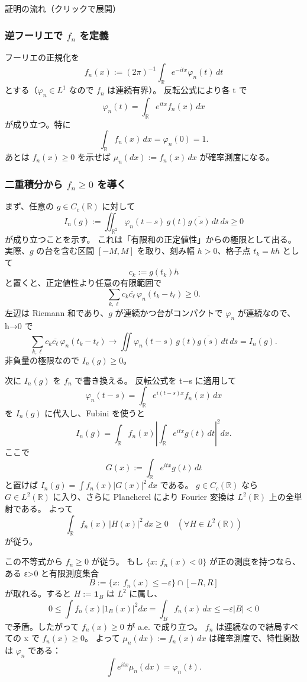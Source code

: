 \documentclass[uplatex,dvipdfmx,11pt,a4paper,openany]{bxjsbook}
\begin{document}
\begin{detailblock}{証明の流れ（クリックで展開）}
\subsubsection{逆フーリエで $f_n$ を定義}
フーリエの正規化を
            \[f_n(x):=(2\pi)^{-1}\int_{\mathbb R} e^{-itx}\varphi_n(t)\,dt\]
            とする（$\varphi_n\in L^1$ なので $f_n$ は連続有界）。
            反転公式により各 t で
            \[\varphi_n(t)=\int_{\mathbb R} e^{itx}f_n(x)\,dx\]
            が成り立つ。特に
            \[\int_{\mathbb R} f_n(x)\,dx=\varphi_n(0)=1.\]
            あとは $f_n(x)\ge 0$ を示せば $\mu_n(dx):=f_n(x)\,dx$ が確率測度になる。

\subsubsection{二重積分から $f_n\ge 0$ を導く}
まず、任意の $g\in C_c(\mathbb R)$ に対して
            \[I_n(g):=\iint_{\mathbb R^2}\varphi_n(t-s)\,g(t)\overline{g(s)}\,dt\,ds \ge 0\]
            が成り立つことを示す。
            これは「有限和の正定値性」からの極限として出る。
            実際、$g$ の台を含む区間 $[-M,M]$ を取り、刻み幅 $h>0$、格子点 $t_k=kh$ として
            \[c_k:=g(t_k)h\]
            と置くと、正定値性より任意の有限範囲で
            \[\sum_{k,\ell} c_k\overline{c_\ell}\,\varphi_n(t_k-t_\ell)\ge 0.\]
            左辺は Riemann 和であり、$g$ が連続かつ台がコンパクトで $\varphi_n$ が連続なので、
            h→0 で
            \[\sum_{k,\ell} c_k\overline{c_\ell}\,\varphi_n(t_k-t_\ell)\to
              \iint \varphi_n(t-s)\,g(t)\overline{g(s)}\,dt\,ds=I_n(g).\]
            非負量の極限なので $I_n(g)\ge 0$。

次に $I_n(g)$ を $f_n$ で書き換える。
            反転公式を t−s に適用して
            \[\varphi_n(t-s)=\int_{\mathbb R} e^{i(t-s)x}f_n(x)\,dx\]
            を $I_n(g)$ に代入し、Fubini を使うと
            \[I_n(g)
              =
              \int_{\mathbb R} f_n(x)\left|\int_{\mathbb R} e^{itx}g(t)\,dt\right|^2 dx.\]
            ここで
            \[G(x):=\int_{\mathbb R} e^{itx}g(t)\,dt\]
            と置けば $I_n(g)=\int f_n(x)|G(x)|^2\,dx$ である。
            $g\in C_c(\mathbb R)$ なら $G\in L^2(\mathbb R)$ に入り、さらに Plancherel により Fourier 変換は $L^2(\mathbb R)$ 上の全単射である。
            よって
            \[\int_{\mathbb R} f_n(x)\,|H(x)|^2\,dx\ge 0
              \quad(\forall H\in L^2(\mathbb R))\]
            が従う。

この不等式から $f_n\ge 0$ が従う。
            もし $\{x:\,f_n(x)<0\}$ が正の測度を持つなら、ある ε>0 と有限測度集合
            \[B:=\{x:\ f_n(x)\le -\varepsilon\}\cap[-R,R]\]
            が取れる。すると $H:=\mathbf 1_B$ は $L^2$ に属し、
            \[0\le \int f_n(x)|1_B(x)|^2dx=\int_B f_n(x)\,dx \le -\varepsilon |B|<0\]
            で矛盾。したがって $f_n(x)\ge 0$ が a.e. で成り立つ。
            $f_n$ は連続なので結局すべての x で $f_n(x)\ge 0$。
            よって $\mu_n(dx):=f_n(x)\,dx$ は確率測度で、特性関数は $\varphi_n$ である：
            \[\int e^{itx}\mu_n(dx)=\varphi_n(t).\]


\end{detailblock}
\end{document}
